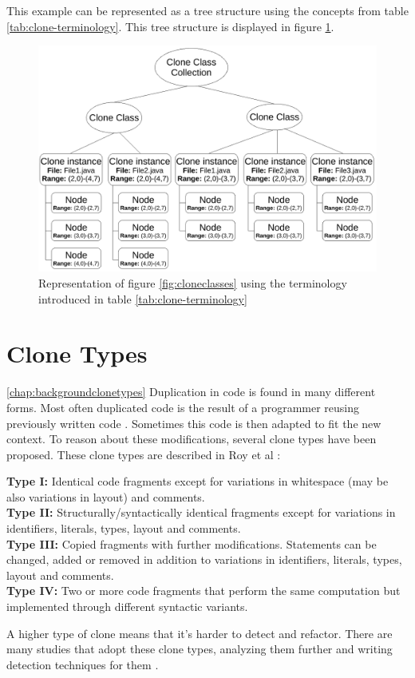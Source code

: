 This example can be represented as a tree structure using the concepts from table \ref{tab:clone-terminology}. This tree structure is displayed in figure \ref{fig:terminologyexample}.

\begin{figure}[H]
  \includegraphics[width=1\columnwidth]{img/TerminologyExample}
  \caption{Representation of figure \ref{fig:cloneclasses} using the terminology introduced in table \ref{tab:clone-terminology}}
  \label{fig:terminologyexample}
\end{figure}

\section{Clone Types} \ref{chap:backgroundclonetypes}
Duplication in code is found in many different forms. Most often duplicated code is the result of a programmer reusing previously written code \cite{haefliger2008code, baxter1998clone}. Sometimes this code is then adapted to fit the new context. To reason about these modifications, several clone types have been proposed. These clone types are described in Roy et al \cite{roy2007survey}:
\begin{displayquote}
\textbf{Type I:} Identical code fragments except for variations in whitespace (may be also variations in layout) and comments.\\
\textbf{Type II:} Structurally/syntactically identical fragments except for variations in identifiers, literals, types, layout and comments.\\
\textbf{Type III:} Copied fragments with further modifications. Statements can be changed, added or removed in addition to variations in identifiers, literals, types, layout and comments.\\
\textbf{Type IV:} Two or more code fragments that perform the same computation but implemented through different syntactic variants.
\end{displayquote}
A higher type of clone means that it's harder to detect and refactor. There are many studies that adopt these clone types, analyzing them further and writing detection techniques for them \cite{sajnani2016sourcerercc, kodhai2010detection, van2019novel}.

